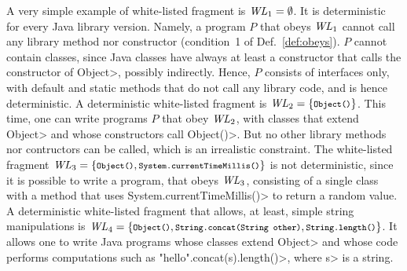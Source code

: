 A very simple example of white-listed fragment is
$\mathit{WL}_1=\emptyset$. It is deterministic for every Java library version.
Namely, a program $P$ that obeys $\mathit{WL}_1$ cannot call any library method nor constructor
(condition~1 of Def.~\ref{def:obeys}). $P$ cannot contain classes, since Java classes
have always at least a constructor that calls the constructor of \<Object>, possibly
indirectly. Hence, $P$ consists of interfaces only,
with default and static methods that do not call any library code, and is hence
deterministic.
A deterministic white-listed fragment is $\wl_2=\{\<Object()>\}$.
This time, one can write programs $P$
that obey $\mathit{WL}_2$, with classes that extend \<Object> and whose constructors call \<Object()>.
But no other library methods nor contructors can be called, which is an irrealistic constraint.
The white-listed fragment $\wl_3=\{\<Object()>,\<System.currentTimeMillis()>\}$ is not deterministic,
since it is possible to write a program, that obeys $\mathit{WL}_3$, consisting of a single class
with a method that uses \<System.currentTimeMillis()> to return a random value.
A deterministic white-listed fragment that allows, at least, simple string manipulations is
$\wl_4=\{\<Object()>,\<String.concat(String other)>,\<String.length()>\}$. It allows one
to write Java programs whose classes extend \<Object> and whose code performs computations
such as \<"hello".concat(s).length()>, where \<s> is a string.

